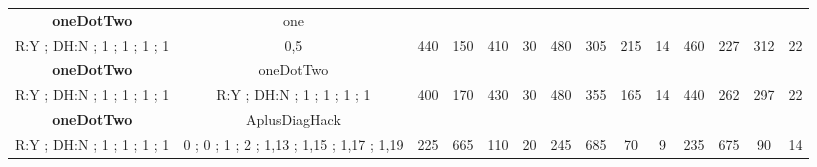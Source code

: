 \begin{table}[H]
{\begin{tabular}{|c|c|c|c|c|c|c|c|c|c|c|c|c|c|}
\cellcolor{blue!15}\textbf{oneDotTwo} & one& {\color[HTML]{00009B} } & {\color[HTML]{9A0000} } & {\color[HTML]{009901} } &  & {\color[HTML]{00009B} } & {\color[HTML]{9A0000} } & {\color[HTML]{009901} } &  & {\color[HTML]{00009B} } & {\color[HTML]{9A0000} } & {\color[HTML]{009901} } &  \\ 
\cellcolor{ blue!15}R:Y ; DH:N ; 1 ; 1 ; 1 ; 1 & 0,5 & \multirow{-2}{*}{{\color[HTML]{00009B} 440}} & \multirow{-2}{*}{{\color[HTML]{9A0000} 150}} & \multirow{-2}{*}{{\color[HTML]{009901} 410}} & \multirow{-2}{*}{30} & \multirow{-2}{*}{{\color[HTML]{00009B} 480}} & \multirow{-2}{*}{{\color[HTML]{9A0000} 305}} & \multirow{-2}{*}{{\color[HTML]{009901} 215}} & \multirow{-2}{*}{14} & \multirow{-2}{*}{{\color[HTML]{00009B} 460}} & \multirow{-2}{*}{{\color[HTML]{9A0000} 227}} & \multirow{-2}{*}{{\color[HTML]{009901} 312}} & \multirow{-2}{*}{22} \\ \hline

\cellcolor{blue!15}\textbf{oneDotTwo} & oneDotTwo& {\color[HTML]{00009B} } & {\color[HTML]{9A0000} } & {\color[HTML]{009901} } &  & {\color[HTML]{00009B} } & {\color[HTML]{9A0000} } & {\color[HTML]{009901} } &  & {\color[HTML]{00009B} } & {\color[HTML]{9A0000} } & {\color[HTML]{009901} } &  \\ 
\cellcolor{ blue!15}R:Y ; DH:N ; 1 ; 1 ; 1 ; 1 & R:Y ; DH:N ; 1 ; 1 ; 1 ; 1 & \multirow{-2}{*}{{\color[HTML]{00009B} 400}} & \multirow{-2}{*}{{\color[HTML]{9A0000} 170}} & \multirow{-2}{*}{{\color[HTML]{009901} 430}} & \multirow{-2}{*}{30} & \multirow{-2}{*}{{\color[HTML]{00009B} 480}} & \multirow{-2}{*}{{\color[HTML]{9A0000} 355}} & \multirow{-2}{*}{{\color[HTML]{009901} 165}} & \multirow{-2}{*}{14} & \multirow{-2}{*}{{\color[HTML]{00009B} 440}} & \multirow{-2}{*}{{\color[HTML]{9A0000} 262}} & \multirow{-2}{*}{{\color[HTML]{009901} 297}} & \multirow{-2}{*}{22} \\ \hline

\cellcolor{blue!15}\textbf{oneDotTwo} & AplusDiagHack& {\color[HTML]{00009B} } & {\color[HTML]{9A0000} } & {\color[HTML]{009901} } &  & {\color[HTML]{00009B} } & {\color[HTML]{9A0000} } & {\color[HTML]{009901} } &  & {\color[HTML]{00009B} } & {\color[HTML]{9A0000} } & {\color[HTML]{009901} } &  \\ 
\cellcolor{ blue!15}R:Y ; DH:N ; 1 ; 1 ; 1 ; 1 & 0 ; 0 ; 1 ; 2 ; 1,13 ; 1,15 ; 1,17 ; 1,19 & \multirow{-2}{*}{{\color[HTML]{00009B} 225}} & \multirow{-2}{*}{{\color[HTML]{9A0000} 665}} & \multirow{-2}{*}{{\color[HTML]{009901} 110}} & \multirow{-2}{*}{20} & \multirow{-2}{*}{{\color[HTML]{00009B} 245}} & \multirow{-2}{*}{{\color[HTML]{9A0000} 685}} & \multirow{-2}{*}{{\color[HTML]{009901} 70}} & \multirow{-2}{*}{9} & \multirow{-2}{*}{{\color[HTML]{00009B} 235}} & \multirow{-2}{*}{{\color[HTML]{9A0000} 675}} & \multirow{-2}{*}{{\color[HTML]{009901} 90}} & \multirow{-2}{*}{14} \\ \hline


\end{tabular}}
\end{table}
